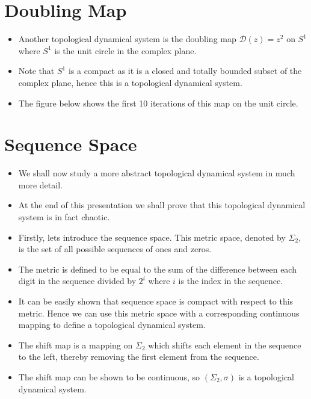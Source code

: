 \documentclass{article}
\begin{document}
    \section{Doubling Map}
    \begin{itemize}
        \item Another topological dynamical system is the doubling map $\mathcal{D}(z) = z^2$ on $S^1$ where $S^1$ is the unit circle in the complex plane.
        \item Note that $S^1$ is a compact as it is a closed and totally bounded subset of the complex plane, hence this is a topological dynamical system.
        \item The figure below shows the first 10 iterations of this map on the unit circle.
    \end{itemize}

    \section{Sequence Space}
    \begin{itemize}
        \item We shall now study a more abstract topological dynamical system in much more detail. 
        \item At the end of this presentation we shall prove that this topological dynamical system is in fact chaotic. 
        \item Firstly, lets introduce the sequence space. This metric space, denoted by $\Sigma_2$, is the set of all possible sequences of ones and zeros.
        \item The metric is defined to be equal to the sum of the difference between each digit in the sequence divided by $2^i$ where $i$ is the index in the sequence.
        \item It can be easily shown that sequence space is compact with respect to this metric. Hence we can use this metric space with a corresponding continuous mapping to define a topological dynamical system.
        \item The shift map is a mapping on $\Sigma_2$ which shifts each element in the sequence to the left, thereby removing the first element from the sequence.
        \item The shift map can be shown to be continuous, so $(\Sigma_2, \sigma)$ is a topological dynamical system.
    \end{itemize}
\end{document}
